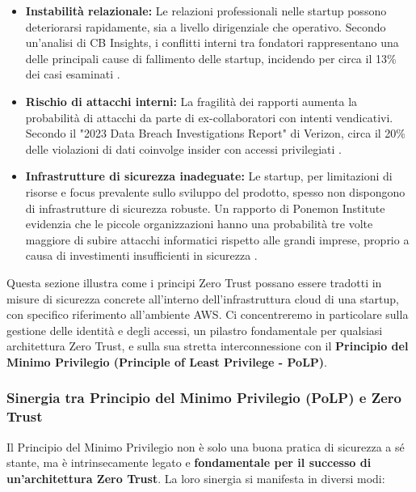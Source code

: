 \begin{itemize}
    \item \textbf{Instabilità relazionale:} Le relazioni professionali nelle startup possono deteriorarsi rapidamente, sia a livello dirigenziale che operativo. Secondo un'analisi di CB Insights, i conflitti interni tra fondatori rappresentano una delle principali cause di fallimento delle startup, incidendo per circa il 13\% dei casi esaminati \cite{CBInsights2023}. 
    \item \textbf{Rischio di attacchi interni:} La fragilità dei rapporti aumenta la probabilità di attacchi da parte di ex-collaboratori con intenti vendicativi. Secondo il "2023 Data Breach Investigations Report" di Verizon, circa il 20\% delle violazioni di dati coinvolge insider con accessi privilegiati \cite{Verizon2023}.
    \item \textbf{Infrastrutture di sicurezza inadeguate:} Le startup, per limitazioni di risorse e focus prevalente sullo sviluppo del prodotto, spesso non dispongono di infrastrutture di sicurezza robuste. Un rapporto di Ponemon Institute evidenzia che le piccole organizzazioni hanno una probabilità tre volte maggiore di subire attacchi informatici rispetto alle grandi imprese, proprio a causa di investimenti insufficienti in sicurezza \cite{Ponemon2023}.
\end{itemize}
Questa sezione illustra come i principi Zero Trust possano essere tradotti in misure di sicurezza concrete all'interno dell'infrastruttura cloud di una startup, con specifico riferimento all'ambiente AWS. Ci concentreremo in particolare sulla gestione delle identità e degli accessi, un pilastro fondamentale per qualsiasi architettura Zero Trust, e sulla sua stretta interconnessione con il \textbf{Principio del Minimo Privilegio (Principle of Least Privilege - PoLP)}.
\subsubsection{Sinergia tra Principio del Minimo Privilegio (PoLP) e Zero Trust}
\label{subsubsec:polp-zerotrust-correlation}

Il Principio del Minimo Privilegio non è solo una buona pratica di sicurezza a sé stante, ma è intrinsecamente legato e \textbf{fondamentale per il successo di un'architettura Zero Trust}. La loro sinergia si manifesta in diversi modi:


